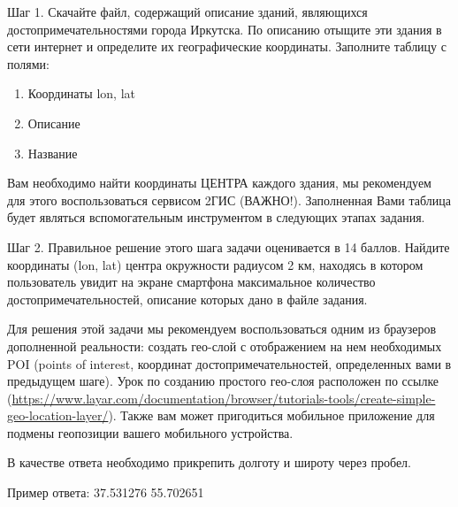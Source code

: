 
Шаг 1. Скачайте файл, содержащий описание зданий, являющихся достопримечательностями города Иркутска. По описанию отыщите эти здания в сети интернет и определите их географические координаты. Заполните таблицу с полями:

\begin{enumerate}
    \item Координаты lon, lat
    \item Описание
    \item Название
\end{enumerate}

Вам необходимо найти координаты ЦЕНТРА каждого здания, мы рекомендуем для этого воспользоваться сервисом 2ГИС (ВАЖНО!). Заполненная Вами таблица будет являться вспомогательным инструментом в следующих этапах задания.

Шаг 2. Правильное решение этого шага задачи оценивается в 14 баллов. Найдите координаты (lon, lat) 
центра окружности радиусом 2 км, находясь в котором пользователь увидит на экране смартфона максимальное 
количество достопримечательностей, описание которых дано в файле задания.  

Для решения этой задачи мы рекомендуем воспользоваться одним из браузеров дополненной реальности: 
создать гео-слой с отображением на нем необходимых POI (points of interest, координат достопримечательностей, 
определенных вами в предыдущем шаге). Урок по созданию простого гео-слоя расположен по ссылке (\url{https://www.layar.com/documentation/browser/tutorials-tools/create-simple-geo-location-layer/}). Также вам может пригодиться мобильное приложение для подмены геопозиции вашего мобильного устройства.

В качестве ответа необходимо прикрепить долготу и широту через пробел.

Пример ответа:  37.531276 55.702651